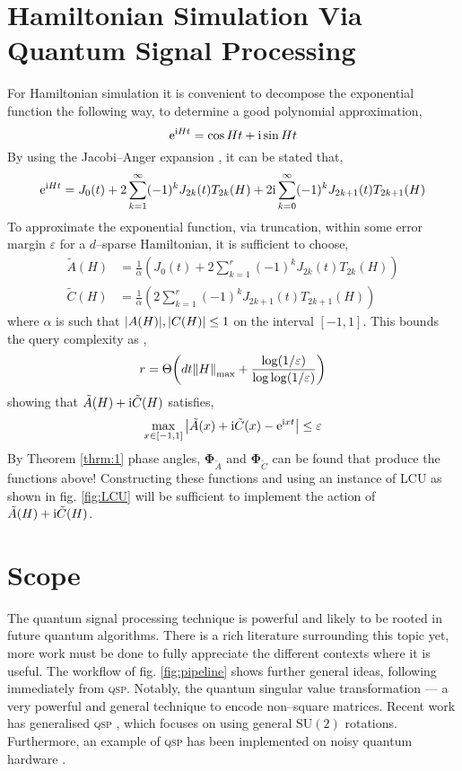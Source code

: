\documentclass{article}
\begin{document}
\clearpage
\section{Hamiltonian Simulation Via Quantum Signal Processing}
For Hamiltonian simulation it is convenient to decompose the exponential function the following way, to determine a good polynomial approximation,
\begin{equation}
    \mathrm{e}^{\mathrm{i} H t} = \cos Ht + \mathrm{i} \sin Ht
\end{equation}
By using the Jacobi--Anger expansion \cite{LC17,CMNRS18}, it can be stated that,
\begin{equation}
    \mathrm{e}^{\mathrm{i} H t} = J_0(t)+ 2\sum_{k=1}^\infty (-1)^k J_{2k}(t)T_{2k}(H) + 2\mathrm{i}\sum_{k=0}^\infty (-1)^k J_{2k+1}(t)T_{2k+1}(H)
\end{equation}
To approximate the exponential function, via truncation, within some error margin $\varepsilon$ for a $d$--sparse Hamiltonian, it is sufficient to choose,
\begin{align}
    \tilde{A}(H) &= \frac{1}{\alpha}\left(J_0(t)+ 2\sum_{k=1}^r (-1)^k J_{2k}(t)T_{2k}(H) \right)\\
    \tilde{C}(H) &= \frac{1}{\alpha}\left(2\sum_{k=1}^r (-1)^k J_{2k+1}(t)T_{2k+1}(H) \right)
\end{align}
where $\alpha$ is such that $\abs{A(H)}, \abs{C(H)} \leq 1$ on the interval $[-1,1]$. This bounds the query complexity as \cite{LC17},
\begin{equation}
    r = \Theta\bigg(dt\norm{H}_{\text{max}} + \frac{\log(1/\varepsilon)}{\log\log(1/\varepsilon)} \bigg)
\end{equation}
showing that $\tilde{A}(H) + \mathrm{i}\tilde{C}(H)$ satisfies,
\begin{equation}
    \max_{x\in[-1,1]}\abs{\tilde{A}(x) + \mathrm{i}\tilde{C}(x) - \mathrm{e}^{\mathrm{i} x t}}\leq \varepsilon
\end{equation}
By Theorem \ref{thrm:1} phase angles, $\boldsymbol{\Phi}_{\tilde{A}}$ and $\boldsymbol{\Phi}_{\tilde{C}}$ can be found that produce the functions above! Constructing these functions and using an instance of \textsc{LCU} as shown in fig. \ref{fig:LCU} will be sufficient to implement the action of $\tilde{A}(H) + \mathrm{i}\tilde{C}(H)$.

\clearpage
\section{Scope}
The quantum signal processing technique is powerful and likely to be rooted in future quantum algorithms. There is a rich literature surrounding this topic yet, more work must be done to fully appreciate the different contexts where it is useful. The workflow of fig. \ref{fig:pipeline} shows further general ideas, following immediately from \textsc{qsp}. Notably, the quantum singular value transformation \cite{GSLW19} --- a very powerful and general technique to encode non--square matrices. Recent work has generalised \textsc{qsp} \cite{MW23}, which focuses on using general $\text{SU}(2)$ rotations. Furthermore, an example of \textsc{qsp} has been implemented on noisy quantum hardware \cite{KKCLB23}. 
\end{document}
